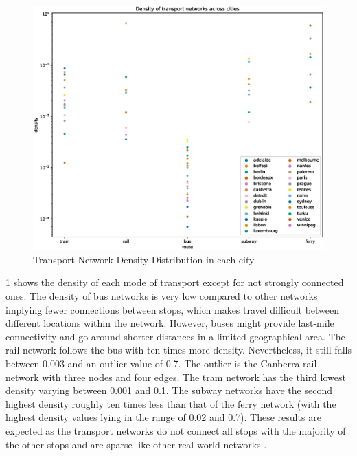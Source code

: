 \documentclass{article}
\theoremstyle{plain}
\theoremstyle{definition}
\theoremstyle{remark}
\begin{document}
\begin{figure}[ht]
\vskip -0.1in
\begin{center}
\centerline{\includegraphics[width=\columnwidth]{images/city_route_density_distribution.eps}}
\caption{Transport Network Density Distribution in each city}
\label{net-density}
\end{center}
\vskip -0.3in
\end{figure}

\cref{net-density} shows the density of each mode of transport except for not strongly connected ones. The density of bus networks is very low compared to other networks implying fewer connections between stops, which makes travel difficult between different locations within the network. However, buses might provide last-mile connectivity and go around shorter distances in a limited geographical area. The rail network follows the bus with ten times more density. Nevertheless, it still falls between 0.003 and an outlier value of 0.7. The outlier is the Canberra rail network with three nodes and four edges. The tram network has the third lowest density varying between 0.001 and 0.1. The subway networks have the second highest density roughly ten times less than that of the ferry network (with the highest density values lying in the range of 0.02 and 0.7). These results are expected as the transport networks do not connect all stops with the majority of the other stops and are sparse like other real-world networks \cite{frossard_2023a}. 
\end{document}
